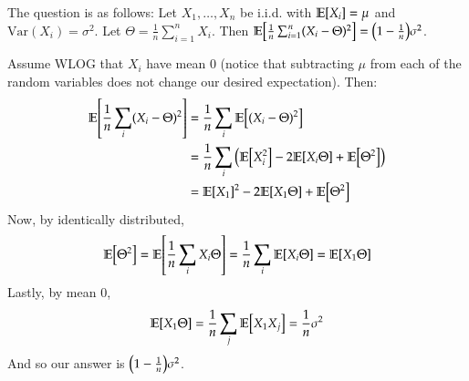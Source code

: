 \documentclass[12pt]{article}
\theoremstyle{definitionstyle}
\newcommand{\1}{\mathds 1}
\newcommand{\E}{\mathbb E \qty}
\newcommand{\Var}{\mathrm{Var}}
\begin{document}
    The question is as follows: Let $X_1, \ldots, X_n$ be i.i.d. with $\E[X_i] = \mu$ and $\Var(X_i) = \sigma^2$. Let $\Theta = \frac 1n \sum_{i=1}^n X_i$. Then $\E[\frac 1n \sum_{i=1}^n (X_i - \Theta)^2] = \qty(1-\frac 1n)\sigma^2$. 

    \newpage Assume WLOG that $X_i$ have mean 0 (notice that subtracting $\mu$ from each of the random variables does not change our desired expectation). Then:
    \begin{align*}
        \E[\frac 1n \sum_i (X_i - \Theta)^2] &= \frac 1n \sum_i \E[(X_i-\Theta)^2] \\
        &= \frac 1n \sum_i \qty(\E[X_i^2] - 2\E[X_i \Theta] + \E[\Theta^2]) \\
        &= \E[X_1]^2 - 2\E[X_1 \Theta] + \E[\Theta^2]
    \end{align*}
    Now, by identically distributed,
    \begin{align*}
        \E[\Theta^2] = \E[\frac 1n \sum_i X_i \Theta] = \frac 1n \sum_i \E[X_i\Theta] = \E[X_1 \Theta]
    \end{align*}
    Lastly, by mean 0,
    \begin{align*}
        \E[X_1 \Theta] = \frac 1n \sum_j \E[X_1 X_j] = \frac 1n \sigma^2
    \end{align*}
    And so our answer is $\qty(1-\frac 1n)\sigma^2$. 
    
\end{document}
